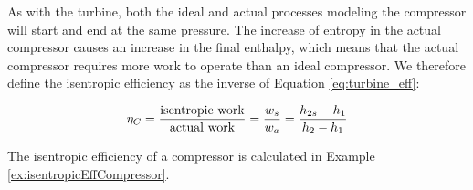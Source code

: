 As with the turbine, both the ideal and actual processes modeling the compressor will start and end at the same pressure.  The increase of entropy in the actual compressor causes an increase in the final enthalpy, which means that the actual compressor requires more work to operate than an ideal compressor.  We therefore define the isentropic efficiency as the inverse of Equation \ref{eq:turbine_eff}:

\begin{equation}\label{eq:comp_eff}
  \eta_C = \frac{\rm isentropic\ work}{\rm actual\ work} = \frac{w_s}{w_a} = \frac{h_{2s} - h_{1}}{h_{2} - h_{1}}
\end{equation}

The isentropic efficiency of a compressor is calculated in Example \ref{ex:isentropicEffCompressor}.

